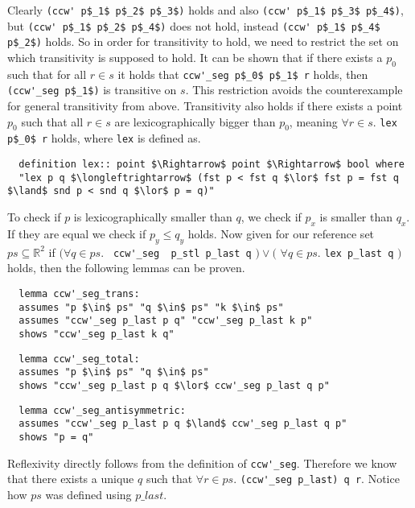 Clearly \lstinline|(ccw' p$_1$ p$_2$ p$_3$)| holds and also 
\lstinline|(ccw' p$_1$ p$_3$ p$_4$)|, but \lstinline|(ccw' p$_1$ p$_2$ p$_4$)| does not hold, instead 
\lstinline|(ccw' p$_1$ p$_4$ p$_2$)| holds. So in order for transitivity to hold, we need to restrict 
the set on which transitivity is supposed to hold. It can be shown that if there exists a $p_0$ such
that for all $r \in s$ it holds that \lstinline|ccw'_seg p$_0$ p$_1$ r| holds, then  
\lstinline|(ccw'_seg p$_1$)| is transitive on $s$. This restriction avoids the counterexample
for general transitivity from above. Transitivity also holds if there exists a point $p_0$ such 
that all $r \in s$ are lexicographically bigger than $p_0$, meaning $\forall r \in s.$ \lstinline|lex p$_0$ r| holds,
where \lstinline|lex| is defined as.
\begin{lstlisting}
  definition lex:: point $\Rightarrow$ point $\Rightarrow$ bool where
  "lex p q $\longleftrightarrow$ (fst p < fst q $\lor$ fst p = fst q $\land$ snd p < snd q $\lor$ p = q)"
\end{lstlisting}
To check if $p$ is lexicographically smaller than $q$, we check if $p_x$ is smaller than $q_x$. If 
they are equal we check if $p_y \leq q_y$ holds. Now given for our reference set 
$ps \subseteq \mathbb{R}^2$ if $(\forall q \in ps.$  \lstinline| ccw'_seg  p_stl p_last q| $)\lor($
$\forall q \in ps.$ \lstinline|lex p_last q| $)$ holds, then the following lemmas can be proven.
\begin{lstlisting}
  lemma ccw'_seg_trans:
  assumes "p $\in$ ps" "q $\in$ ps" "k $\in$ ps"
  assumes "ccw'_seg p_last p q" "ccw'_seg p_last k p"
  shows "ccw'_seg p_last k q"
\end{lstlisting}
\begin{lstlisting}
  lemma ccw'_seg_total:
  assumes "p $\in$ ps" "q $\in$ ps"
  shows "ccw'_seg p_last p q $\lor$ ccw'_seg p_last q p"
\end{lstlisting}
\begin{lstlisting}
  lemma ccw'_seg_antisymmetric:
  assumes "ccw'_seg p_last p q $\land$ ccw'_seg p_last q p"
  shows "p = q"
\end{lstlisting}
Reflexivity directly follows from the definition of \lstinline|ccw'_seg|. Therefore we know
that there exists a unique $q$ such that $\forall r \in ps.$ \lstinline|(ccw'_seg p_last) q r|.
Notice how $ps$ was defined using $p\_last$.

